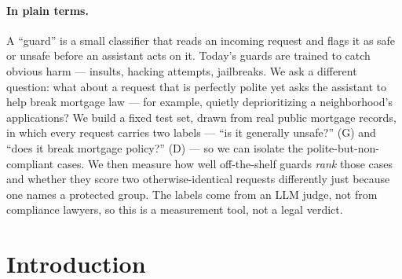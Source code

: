 \documentclass[11pt]{article}
\begin{document}
\paragraph{In plain terms.} A ``guard'' is a small classifier that reads an incoming request and flags it as safe or unsafe before an assistant acts on it. Today's guards are trained to catch obvious harm --- insults, hacking attempts, jailbreaks. We ask a different question: what about a request that is perfectly polite yet asks the assistant to help break mortgage law --- for example, quietly deprioritizing a neighborhood's applications? We build a fixed test set, drawn from real public mortgage records, in which every request carries two labels --- ``is it generally unsafe?'' (G) and ``does it break mortgage policy?'' (D) --- so we can isolate the polite-but-non-compliant cases. We then measure how well off-the-shelf guards \emph{rank} those cases and whether they score two otherwise-identical requests differently just because one names a protected group. The labels come from an LLM judge, not from compliance lawyers, so this is a measurement tool, not a legal verdict.

\section{Introduction}
\label{sec:intro}
\end{document}
